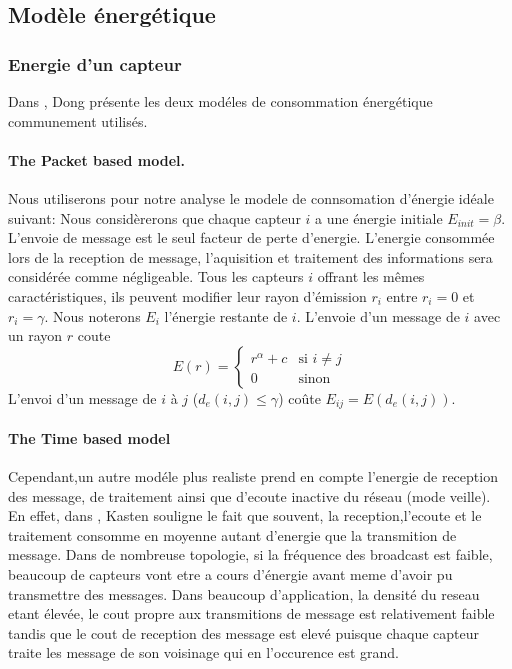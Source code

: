 \subsection{Modèle énergétique}
\subsubsection{Energie d'un capteur}
Dans \cite{Dong2005}, Dong présente les deux modéles de consommation énergétique communement utilisés.
\paragraph{The Packet based model.}
Nous utiliserons pour notre analyse le modele de connsomation d'énergie idéale suivant:
Nous considèrerons que chaque capteur $i$ a une énergie initiale $E_{init}=\beta$.
L'envoie de message est le seul facteur de perte d'energie. L'energie consommée lors de la reception de message, l'aquisition et traitement des informations sera considérée comme négligeable.
Tous les capteurs $i$ offrant les mêmes caractéristiques, ils peuvent modifier leur rayon d'émission $r_i$ entre $r_i=0$ et $r_i=\gamma$.
Nous noterons $E_i$ l'énergie restante de $i$.
L'envoie d'un message de $i$ avec un rayon $r$ coute $$ E(r)= \begin{cases} r^\alpha + c & \text{si }i\neq j \\ 0 & \text{sinon}  \end{cases}$$
L'envoi d'un message de $i$ à $j$ ($d_e(i,j)\leq \gamma$) coûte  $ E_{ij}=E(d_e(i,j))$.

\paragraph{The Time based model}
Cependant,un autre modéle plus realiste prend en compte l'energie de reception des message, de traitement ainsi que d'ecoute inactive du réseau (mode veille).
En effet, dans \cite{Kasten2001}, Kasten souligne le fait que souvent, la reception,l'ecoute et le traitement consomme en moyenne autant d'energie que la transmition de message.
Dans de nombreuse topologie, si la fréquence des broadcast est faible, beaucoup de capteurs vont etre a cours d'énergie avant meme d'avoir pu transmettre des messages.
Dans beaucoup d'application, la densité du reseau etant élevée, le cout propre aux transmitions de message est relativement faible tandis que le cout de reception des message est elevé puisque chaque capteur traite les message de son voisinage
qui en l'occurence est grand.



